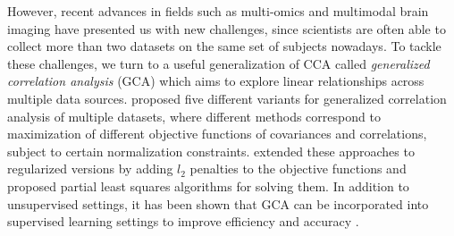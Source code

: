 \documentclass[11pt]{article}
\newcommand{\nb}[1]{\textcolor{orange}{\texttt{[#1]}}}
\newcommand{\0}{{\mathbf{0}}}
\begin{document}
However, recent advances in 
fields such as multi-omics and multimodal brain imaging have presented us with new challenges, since scientists are often able to collect more than two datasets on the same set of subjects nowadays.
To tackle these challenges, we turn to
a useful generalization of CCA called \textit{generalized correlation analysis} (GCA) \citep{kettenring1971canonical} which 
aims to explore linear relationships across multiple data sources. 
\citet{kettenring1971canonical} proposed five different variants for generalized correlation analysis of multiple datasets, 
where
different methods correspond to maximization of different objective functions of covariances and correlations, 
subject to certain normalization constraints.
\citet{tenenhaus2011regularized} extended 
these approaches
to regularized versions by adding $l_2$ penalties to the objective functions and proposed partial least squares algorithms for solving them. 
In addition to unsupervised settings, it has been shown that GCA can be incorporated into supervised learning settings to improve efficiency and accuracy \citep{shen2014generalized}. 
\end{document}
